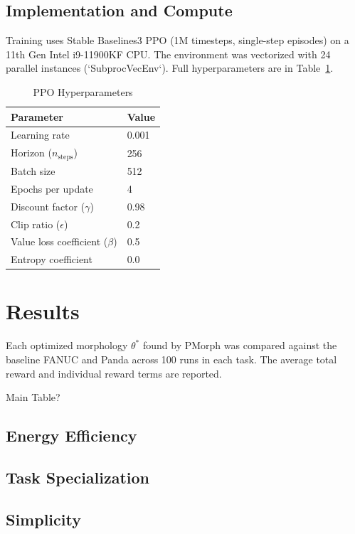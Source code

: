 \documentclass[defaultstyle,11pt]{thesis}
\begin{document}
\subsection{Implementation and Compute}

Training uses Stable Baselines3 PPO (1M timesteps, single-step episodes) on a 11th Gen Intel i9-11900KF CPU. The environment was vectorized with 24 parallel instances (`SubprocVecEnv`). Full hyperparameters are in Table~\ref{tab:hyperparams}.

\begin{table}[H]
\caption{PPO Hyperparameters}
\label{tab:hyperparams}
\centering
\begin{tabular}{ll}
\hline
\textbf{Parameter} & \textbf{Value} \\
\hline
Learning rate & 0.001 \\
Horizon (\(n_\text{steps}\)) & 256 \\
Batch size & 512 \\
Epochs per update & 4 \\
Discount factor (\(\gamma\)) & 0.98 \\
Clip ratio (\(\epsilon\)) & 0.2 \\
Value loss coefficient (\(\beta\)) & 0.5 \\
Entropy coefficient & 0.0 \\
\hline
\end{tabular}
\end{table}

\section{Results}

Each optimized morphology \(\theta^*\) found by PMorph was compared against the baseline FANUC and Panda across 100 runs in each task.
The average total reward and individual reward terms are reported.

Main Table?

\subsection{Energy Efficiency}

\subsection{Task Specialization}

\subsection{Simplicity}
\end{document}
